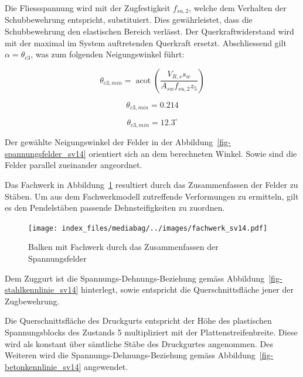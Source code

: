 \documentclass[
  12pt,
  letterpaper,
  egregdoesnotlikesansseriftitles]{scrreprt}
\begin{document}
Die Fliessspannung wird mit der Zugfestigkeit \(f_{su,2}\), welche dem
Verhalten der Schubbewehrung entspricht, substituiert. Dies
gewährleistet, dass die Schubbewehrung den elastischen Bereich verlässt.
Der Querkraftwiderstand wird mit der maximal im System auftretenden
Querkraft ersetzt. Abschliessend gilt \(\alpha = \theta_{c3}\), was zum
folgenden Neigungswinkel führt:

\begin{equation}\theta_{c3,min} = \operatorname{acot}{\left(\frac{V_{R,s} s_{w}}{A_{s w} f_{su,2} z_{5}} \right)}\end{equation}

\begin{equation}\theta_{c3,min} = 0.214\end{equation}

\begin{equation}\theta_{c3,min} = 12.3 ^\circ\end{equation}

Der gewählte Neigungswinkel der Felder in der
Abbildung~\ref{fig-spannungsfelder_sv14} orientiert sich an dem
berechneten Winkel. Sowie sind die Felder parallel zueinander
angeordnet.

Das Fachwerk in Abbildung~\ref{fig-fachwerk_sv14} resultiert durch das
Zusammenfassen der Felder zu Stäben. Um aus dem Fachwerkmodell
zutreffende Verformungen zu ermitteln, gilt es den Pendelstäben passende
Dehnsteifigkeiten zu zuordnen.

\begin{figure}[H]

{\centering \texttt{[image: index\_files/mediabag/../images/fachwerk\_sv14.pdf]}

}

\caption{\label{fig-fachwerk_sv14}Balken mit Fachwerk durch das
Zusammenfassen der Spannungsfelder}

\end{figure}

Dem Zuggurt ist die Spannungs-Dehnungs-Beziehung gemäss
Abbildung~\ref{fig-stahlkennlinie_sv14} hinterlegt, sowie entspricht die
Querschnittsfläche jener der Zugbewehrung.

Die Querschnittsfläche des Druckgurts entspricht der Höhe des
plastischen Spannungsblocks des Zustands 5 multipliziert mit der
Plattenstreifenbreite. Diese wird als konstant über sämtliche Stäbe des
Druckgurtes angenommen. Des Weiteren wird die
Spannungs-Dehnungs-Beziehung gemäss
Abbildung~\ref{fig-betonkennlinie_sv14} angewendet.
\end{document}
